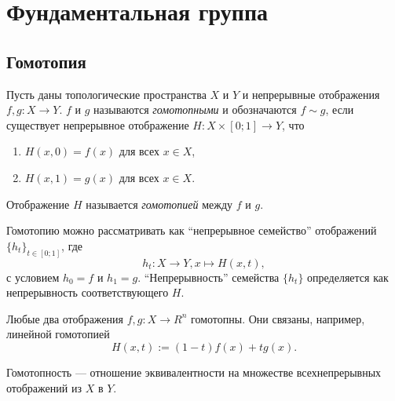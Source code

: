 \documentclass[12pt,a4paper]{article}
\begin{document}
    \section{Фундаментальная группа}

    \subsection{Гомотопия}

    \begin{definition}
        Пусть даны топологические пространства $X$ и $Y$ и непрерывные отображения $f, g: X \to Y$. $f$ и $g$ называются \emph{гомотопными} и обозначаются $f \sim g$, если существует непрерывное отображение $H: X \times [0; 1] \to Y$, что
        \begin{enumerate}
            \item $H(x, 0) = f(x)$ для всех $x \in X$,
            \item $H(x, 1) = g(x)$ для всех $x \in X$.
        \end{enumerate}
        Отображение $H$ называется \emph{гомотопией} между $f$ и $g$.
    \end{definition}

    \begin{remark*}
        Гомотопию можно рассматривать как ``непрерывное семейство'' отображений $\{h_t\}_{t \in [0; 1]}$, где
        \[h_t: X \to Y, x \mapsto H(x,t),\]
        с условием $h_0 = f$ и $h_1 = g$. ``Непрерывность'' семейства $\{h_t\}$ определяется как непрерывность соответствующего $H$.
    \end{remark*}

    \begin{example}
        Любые два отображения $f, g: X \to R^n$ гомотопны. Они связаны, например, линейной гомотопией
        \[H(x, t) := (1-t) f(x) + t g(x).\]
    \end{example}

    \begin{theorem}
        Гомотопность --- отношение эквивалентности на множестве всехнепрерывных отображений из $X$ в $Y$.
    \end{theorem}
\end{document}
